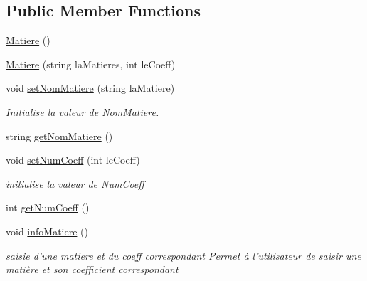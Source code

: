 \subsection*{Public Member Functions}
\begin{DoxyCompactItemize}
\item 
\hyperlink{class_matiere_a0d9dbc35cd0221225366e2ba189c4b42}{Matiere} ()
\item 
\hyperlink{class_matiere_ae70756b9d319ed60372661085615f494}{Matiere} (string la\+Matieres, int le\+Coeff)
\item 
void \hyperlink{class_matiere_af33ccb2e0fa48a8cb25321ba2333791b}{set\+Nom\+Matiere} (string la\+Matiere)
\begin{DoxyCompactList}\small\item\em Initialise la valeur de Nom\+Matiere. \end{DoxyCompactList}\item 
string \hyperlink{class_matiere_a5a31f5b5b20f39cdbf6136cde25ecd31}{get\+Nom\+Matiere} ()
\item 
void \hyperlink{class_matiere_a8890ab57fcdbb6c90c81de7315a38f8b}{set\+Num\+Coeff} (int le\+Coeff)
\begin{DoxyCompactList}\small\item\em initialise la valeur de Num\+Coeff \end{DoxyCompactList}\item 
int \hyperlink{class_matiere_acde1642295616bbcdac2fe270563d12f}{get\+Num\+Coeff} ()
\item 
void \hyperlink{class_matiere_a7f60252430a2517a7c0124d5abe1240e}{info\+Matiere} ()
\begin{DoxyCompactList}\small\item\em saisie d'une matiere et du coeff correspondant Permet à l'utilisateur de saisir une matière et son coefficient correspondant \end{DoxyCompactList}\end{DoxyCompactItemize}


